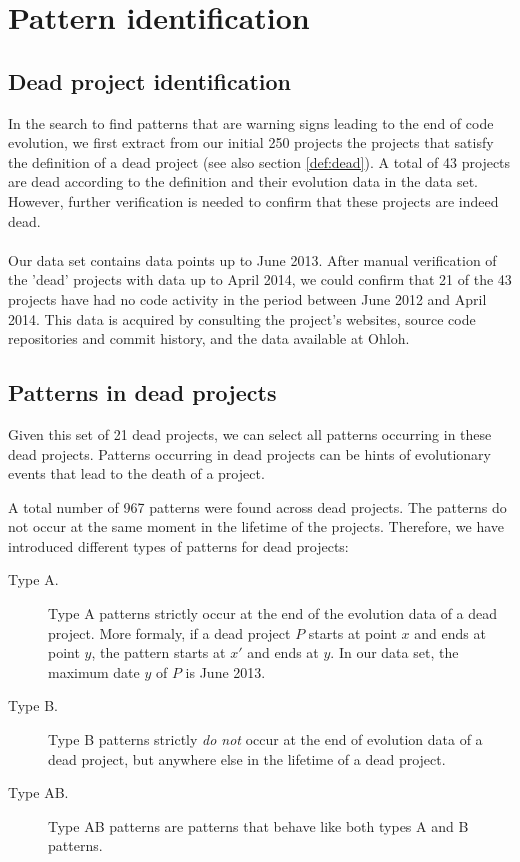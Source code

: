 \section{Pattern identification}
\subsection{Dead project identification}
In the search to find patterns that are warning signs leading to the end of
code evolution, we first extract from our initial 250 projects the projects
that satisfy the definition of a dead project (see also section \ref{def:dead}).
A total of 43 projects are dead according to the definition and their evolution
data in the data set. However, further verification is needed to confirm that
these projects are indeed dead.

\paragraph{}
Our data set contains data points up to June 2013. After manual verification of
the 'dead' projects with data up to April 2014, we could confirm that 21 of the
43 projects have had no code activity in the period between June 2012 and
April 2014. This data is acquired by consulting the project's websites, source
code repositories and commit history, and the data available at Ohloh.

\subsection{Patterns in dead projects}
Given this set of 21 dead projects, we can select all patterns occurring in
these dead projects. Patterns occurring in dead projects can be hints of
evolutionary events that lead to the death of a project.

A total number of 967 patterns were found across dead projects. The patterns
do not occur at the same moment in the lifetime of the projects. Therefore, we
have introduced different types of patterns for dead projects:

\begin{description}
	\item[Type A.] Type A patterns strictly occur at the end of the evolution data
		of a dead project. More formaly, if a dead project $P$ starts at point $x$ and
		ends at point $y$, the pattern starts at $x'$ and ends at $y$. In our data
		set, the maximum date $y$ of $P$ is June 2013.
	
	\item[Type B.] Type B patterns strictly \emph{do not }\rm occur at the end of
		evolution data of a dead project, but anywhere else in the lifetime of a dead
		project.
	
	\item[Type AB.] Type AB patterns are patterns that behave like both types A and
		B patterns.
\end{description}

